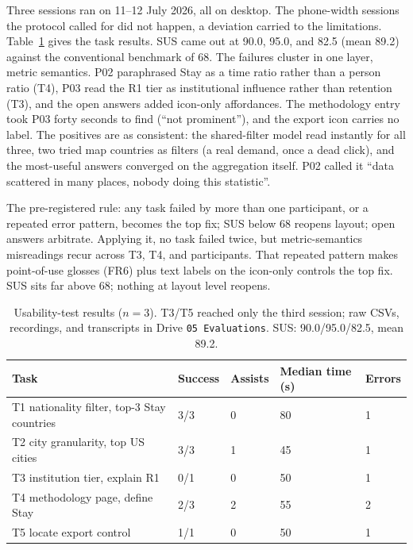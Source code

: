 Three sessions ran on 11--12 July 2026, all on desktop. The phone-width sessions the protocol called for did not happen, a deviation carried to the limitations. Table~\ref{tab:eval2} gives the task results. SUS came out at 90.0, 95.0, and 82.5 (mean 89.2) against the conventional benchmark of 68. The failures cluster in one layer, metric semantics. P02 paraphrased Stay as a time ratio rather than a person ratio (T4), P03 read the R1 tier as institutional influence rather than retention (T3), and the open answers added icon-only affordances. The methodology entry took P03 forty seconds to find (``not prominent''), and the export icon carries no label. The positives are as consistent: the shared-filter model read instantly for all three, two tried map countries as filters (a real demand, once a dead click), and the most-useful answers converged on the aggregation itself. P02 called it ``data scattered in many places, nobody doing this statistic''.

The pre-registered rule: any task failed by more than one participant, or a repeated error pattern, becomes the top fix; SUS below 68 reopens layout; open answers arbitrate. Applying it, no task failed twice, but metric-semantics misreadings recur across T3, T4, and participants. That repeated pattern makes point-of-use glosses (FR6) plus text labels on the icon-only controls the top fix. SUS sits far above 68; nothing at layout level reopens.

\begin{table}[!t]
\centering\small
\begin{tabular}{@{}lllll@{}}
\toprule
Task & Success & Assists & Median time (s) & Errors \\
\midrule
T1 nationality filter, top-3 Stay countries & 3/3 & 0 & 80 & 1 \\
T2 city granularity, top US cities & 3/3 & 1 & 45 & 1 \\
T3 institution tier, explain R1 & 0/1 & 0 & 50 & 1 \\
T4 methodology page, define Stay & 2/3 & 2 & 55 & 2 \\
T5 locate export control & 1/1 & 0 & 50 & 1 \\
\bottomrule
\end{tabular}
\caption{Usability-test results ($n=3$). T3/T5 reached only the third session; raw CSVs, recordings, and transcripts in Drive \texttt{05 Evaluations}. SUS: 90.0/95.0/82.5, mean 89.2.}
\label{tab:eval2}
\end{table}
